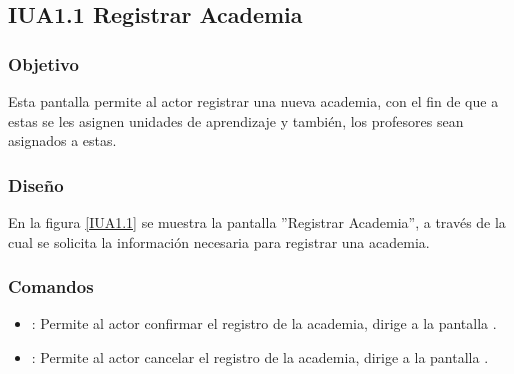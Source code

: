\subsection{IUA1.1 Registrar Academia}

\subsubsection{Objetivo}
	Esta pantalla permite al actor registrar una nueva academia, con el fin de que a estas se les asignen unidades de aprendizaje y también, los profesores sean asignados a estas.

\subsubsection{Diseño}

    En la figura \ref{IUA1.1} se muestra la pantalla ''Registrar Academia'', a través de la cual se solicita la información necesaria para registrar una academia.
 

\subsubsection{Comandos}
    \begin{itemize}
	\item {}: Permite al actor confirmar el registro de la academia, dirige a la pantalla .
	
	\item {}: Permite al actor cancelar el registro de la academia, dirige a la pantalla .
    \end{itemize}

